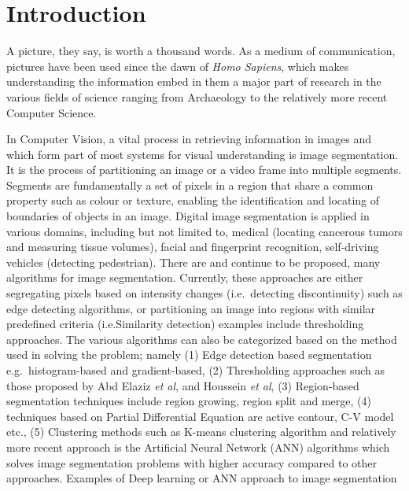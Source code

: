 \documentclass[sigconf,natbib=false]{acmart}
\begin{document}
\section{Introduction}
A picture, they say, is worth a thousand words. As a medium of communication,
pictures have been used since the dawn of \textit{Homo Sapiens}\cite{Yuval},
which makes understanding the information embed in them a major part of research
in the various fields of science ranging from Archaeology to the relatively
more recent Computer Science.\par
In Computer Vision, a vital process in retrieving information in images and
which form part of most systems for visual understanding is image
segmentation\cite{ForsythPonce}. It is the process of partitioning an image or a
video frame into multiple segments\cite{YingTan}. Segments are fundamentally a
set of pixels in a region that share a common property such as colour or
texture, enabling the identification and locating of boundaries of objects in an
image\cite{DassDevi}. Digital image segmentation is applied in various domains, 
including but not limited to, medical (locating cancerous tumors and measuring
tissue volumes)\cite{PhamXuPrince}, facial and fingerprint recognition,
self-driving vehicles (detecting pedestrian). There are and continue to be
proposed, many algorithms for image segmentation. Currently, these approaches are
either segregating pixels based on intensity changes (i.e.~detecting discontinuity)
such as edge detecting algorithms, or partitioning an image into regions with
similar predefined criteria (i.e.Similarity detection) examples include
thresholding approaches. The various algorithms can also be categorized based on
the method used in solving the problem; namely (1) Edge detection based
segmentation e.g.~histogram-based\cite{ZengLiMengYangLiu} and
gradient-based\cite{SaifHammadAlqubati}, (2) Thresholding approaches such
as those proposed by Abd Elaziz \textit{et al}\cite{ElazizBhattacharyyaLu}, and
Houssein \textit{et al}\cite{HousseinEmamAli}, (3) Region-based segmentation
techniques include region growing\cite{ChengWang, Jothiaruna}, region split and
merge\cite{Lachaize, LiuSclaroff}, (4) techniques based on Partial Differential
Equation are active contour\cite{KassWT}, C-V model\cite{WangWWF} etc., (5)
Clustering methods such as K-means clustering algorithm\cite{YanCaiGaoLuo} and
relatively more recent approach is the Artificial Neural Network (ANN) algorithms
which solves image segmentation problems with higher accuracy compared to other
approaches. Examples of Deep learning or ANN approach to image segmentation
\end{document}
